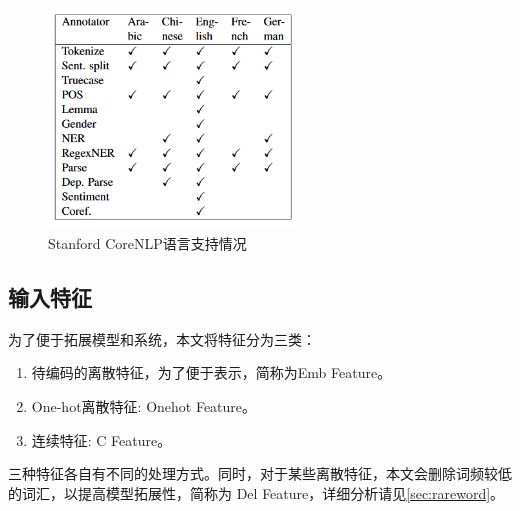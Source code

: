 \begin{figure}[!htbp]
\begin{center}
\includegraphics[width=0.6\textwidth]{graphic/stanfordcorenlpf2.PNG}
\caption{Stanford CoreNLP语言支持情况 \label{fig:corenlpf2}}
\end{center}
\end{figure}


\subsection{输入特征}
为了便于拓展模型和系统，本文将特征分为三类：\par
\begin{enumerate}
\item 待编码的离散特征，为了便于表示，简称为Emb Feature。
\item One-hot离散特征: Onehot Feature。
\item 连续特征: C Feature。
\end{enumerate}
\par
三种特征各自有不同的处理方式。同时，对于某些离散特征，本文会删除词频较低的词汇，以提高模型拓展性，简称为 Del Feature，详细分析请见\ref{sec:rareword}。
